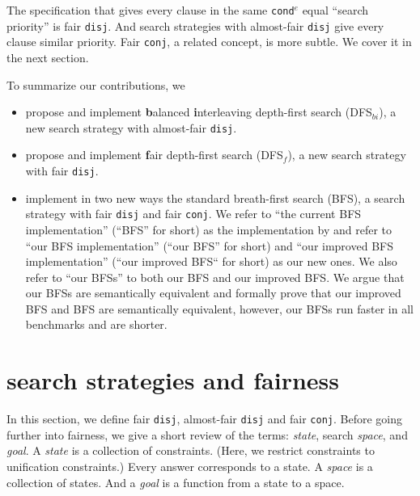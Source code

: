 \documentclass[format=acmlarge, review=true, authordraft=true]{acmart}
\newcommand{\conde}{\texttt{cond$^e$}}
\newcommand{\conj}{\texttt{conj}}
\newcommand{\disj}{\texttt{disj}}
\newcommand{\DFSf }[0]{DFS$_{f}$}
\newcommand{\DFSbi}[0]{DFS$_{bi}$}
\newcommand{\BFS}[0]{BFS}
\newcommand{\BFSser}[0]{BFS}
\newcommand{\BFSuni}[0]{our BFS}
\newcommand{\BFSimp}[0]{our improved BFS}
\begin{document}
The specification that gives every clause in the same \conde{} equal 
``search priority'' is fair \disj{}. And search strategies with 
almost-fair \disj{} give every clause similar priority. 
Fair \conj{}, a related concept, is more subtle. We cover it in the next 
section.

To summarize our contributions, we
\begin{itemize}
	\item propose and implement \textbf{b}alanced \textbf{i}nterleaving 
depth-first search (\DFSbi{}), a new search strategy with almost-fair \disj{}.
	\item propose and implement \textbf{f}air depth-first search (\DFSf{}), 
a new search strategy with fair \disj{}.
	\item implement in two new ways the standard breath-first search (\BFS), a 
search strategy with fair \disj{} and fair \conj{}. We refer to ``the current 
BFS implementation'' (``BFS'' for short) as the implementation by 
\citet{seres1999algebra} and refer to ``our BFS implementation'' (``our BFS'' 
for short) and ``our improved BFS implementation'' (``our improved BFS`` for 
short) as our new ones. We also refer to ``our \BFS{}s'' to both \BFSuni{} and 
\BFSimp{}. We argue that our \BFS{}s are semantically equivalent and formally 
prove that \BFSimp{} and \BFSser{} are semantically equivalent, however, our 
\BFS{}s run faster in all benchmarks and are shorter.
\end{itemize}


\section{search strategies and fairness}

In this section, we define fair \disj{}, almost-fair \disj{} and fair \conj{}. 
Before going further into fairness, we give a short review of the terms:
\emph{state}, search \emph{space}, and \emph{goal}.
A \emph{state} is a collection of constraints. (Here, we restrict 
constraints to unification constraints.) Every answer corresponds to a 
state. A \emph{space} is a collection of states. And a \emph{goal} is a 
function from a state to a space.
\end{document}
